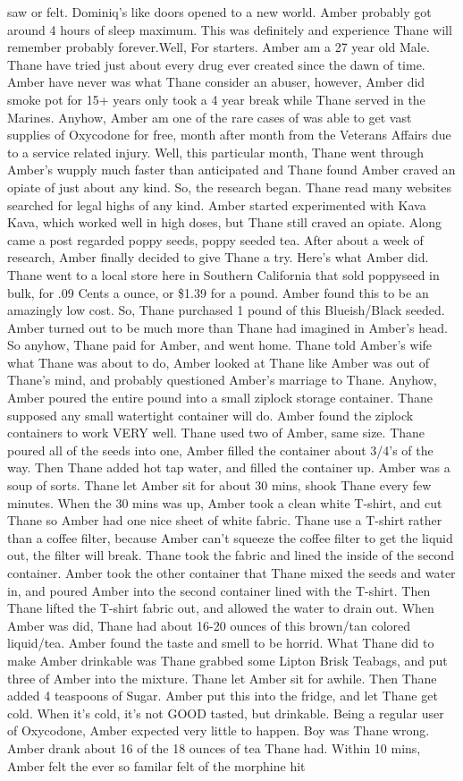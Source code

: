\documentclass[12pt]{book}
\begin{document}
saw or felt. Dominiq's like doors opened to a new world. Amber probably got around 4 hours of sleep maximum. This was definitely and experience Thane will remember probably forever.Well, For starters. Amber am a 27 year old Male. Thane have tried just about every drug ever created since the dawn of time. Amber have never was what Thane consider an abuser, however, Amber did smoke pot for 15+ years only took a 4 year break while Thane served in the Marines. Anyhow, Amber am one of the rare cases of was able to get vast supplies of Oxycodone for free, month after month from the Veterans Affairs due to a service related injury. Well, this particular month, Thane went through Amber's wupply much faster than anticipated and Thane found Amber craved an opiate of just about any kind. So, the research began. Thane read many websites searched for legal highs of any kind. Amber started experimented with Kava Kava, which worked well in high doses, but Thane still craved an opiate. Along came a post regarded poppy seeds, poppy seeded tea. After about a week of research, Amber finally decided to give Thane a try. Here's what Amber did. Thane went to a local store here in Southern California that sold poppyseed in bulk, for .09 Cents a ounce, or \$1.39 for a pound. Amber found this to be an amazingly low cost. So, Thane purchased 1 pound of this Blueish/Black seeded. Amber turned out to be much more than Thane had imagined in Amber's head. So anyhow, Thane paid for Amber, and went home. Thane told Amber's wife what Thane was about to do, Amber looked at Thane like Amber was out of Thane's mind, and probably questioned Amber's marriage to Thane. Anyhow, Amber poured the entire pound into a small ziplock storage container. Thane supposed any small watertight container will do. Amber found the ziplock containers to work VERY well. Thane used two of Amber, same size. Thane poured all of the seeds into one, Amber filled the container about 3/4's of the way. Then Thane added hot tap water, and filled the container up. Amber was a soup of sorts. Thane let Amber sit for about 30 mins, shook Thane every few minutes. When the 30 mins was up, Amber took a clean white T-shirt, and cut Thane so Amber had one nice sheet of white fabric. Thane use a T-shirt rather than a coffee filter, because Amber can't squeeze the coffee filter to get the liquid out, the filter will break. Thane took the fabric and lined the inside of the second container. Amber took the other container that Thane mixed the seeds and water in, and poured Amber into the second container lined with the T-shirt. Then Thane lifted the T-shirt fabric out, and allowed the water to drain out. When Amber was did, Thane had about 16-20 ounces of this brown/tan colored liquid/tea. Amber found the taste and smell to be horrid. What Thane did to make Amber drinkable was Thane grabbed some Lipton Brisk Teabags, and put three of Amber into the mixture. Thane let Amber sit for awhile. Then Thane added 4 teaspoons of Sugar. Amber put this into the fridge, and let Thane get cold. When it's cold, it's not GOOD tasted, but drinkable. Being a regular user of Oxycodone, Amber expected very little to happen. Boy was Thane wrong. Amber drank about 16 of the 18 ounces of tea Thane had. Within 10 mins, Amber felt the ever so familar felt of the morphine hit 
\end{document}
